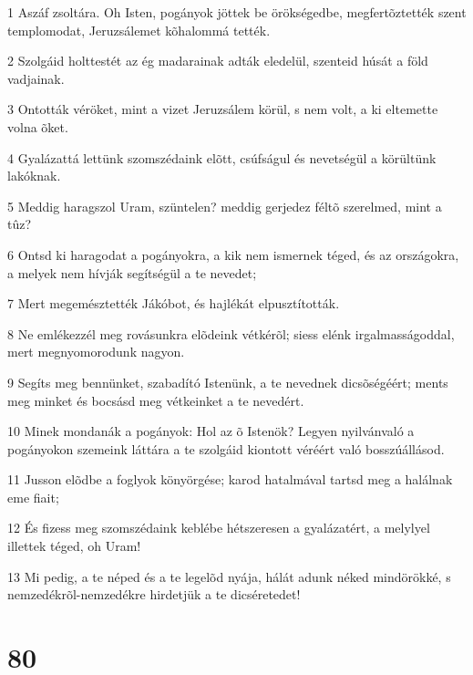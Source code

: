 \par 1 Aszáf zsoltára. Oh Isten, pogányok jöttek be örökségedbe, megfertõztették szent templomodat, Jeruzsálemet kõhalommá tették.
\par 2 Szolgáid holttestét az ég madarainak adták eledelül, szenteid húsát a föld vadjainak.
\par 3 Ontották véröket, mint a vizet Jeruzsálem körül, s nem volt, a ki eltemette volna õket.
\par 4 Gyalázattá lettünk szomszédaink elõtt, csúfságul és nevetségül a körültünk lakóknak.
\par 5 Meddig haragszol Uram, szüntelen? meddig gerjedez féltõ szerelmed, mint a tûz?
\par 6 Ontsd ki haragodat a pogányokra, a kik nem ismernek téged, és az országokra, a melyek nem hívják segítségül a te nevedet;
\par 7 Mert megemésztették Jákóbot, és hajlékát elpusztították.
\par 8 Ne emlékezzél meg rovásunkra elõdeink vétkérõl; siess elénk irgalmasságoddal, mert megnyomorodunk nagyon.
\par 9 Segíts meg bennünket, szabadító Istenünk, a te nevednek dicsõségéért; ments meg minket és bocsásd meg vétkeinket a te nevedért.
\par 10 Minek mondanák a pogányok: Hol az õ Istenök? Legyen nyilvánvaló a pogányokon szemeink láttára a te szolgáid kiontott véréért való bosszúállásod.
\par 11 Jusson elõdbe a foglyok könyörgése; karod hatalmával tartsd meg a halálnak eme fiait;
\par 12 És fizess meg szomszédaink keblébe hétszeresen a gyalázatért, a melylyel illettek téged, oh Uram!
\par 13 Mi pedig, a te néped és a te legelõd nyája, hálát adunk néked mindörökké, s nemzedékrõl-nemzedékre hirdetjük a te dicséretedet!

\chapter{80}

